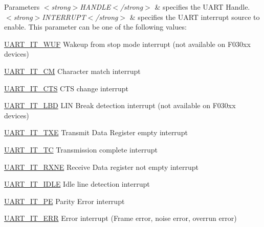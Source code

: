 \begin{DoxyParams}{Parameters}
{\em $<$strong$>$\+H\+A\+N\+D\+L\+E$<$/strong$>$} & specifies the U\+A\+RT Handle. \\
\hline
{\em $<$strong$>$\+I\+N\+T\+E\+R\+R\+U\+P\+T$<$/strong$>$} & specifies the U\+A\+RT interrupt source to enable. This parameter can be one of the following values\+: \begin{DoxyItemize}
\item \hyperlink{group___u_a_r_t___interrupt__definition_gab8899f6307781779f65a7c18aabb3204}{U\+A\+R\+T\+\_\+\+I\+T\+\_\+\+W\+UF} Wakeup from stop mode interrupt (not available on F030xx devices) \item \hyperlink{group___u_a_r_t___interrupt__definition_ga4c22e866bce68975a180828012489106}{U\+A\+R\+T\+\_\+\+I\+T\+\_\+\+CM} Character match interrupt \item \hyperlink{group___u_a_r_t___interrupt__definition_ga986d271478550f9afa918262ca642333}{U\+A\+R\+T\+\_\+\+I\+T\+\_\+\+C\+TS} C\+TS change interrupt \item \hyperlink{group___u_a_r_t___interrupt__definition_gabca5e77508dc2dd9aa26fcb683d9b988}{U\+A\+R\+T\+\_\+\+I\+T\+\_\+\+L\+BD} L\+IN Break detection interrupt (not available on F030xx devices) \item \hyperlink{group___u_a_r_t___interrupt__definition_ga552636e2af516d578856f5ee2ba71ed7}{U\+A\+R\+T\+\_\+\+I\+T\+\_\+\+T\+XE} Transmit Data Register empty interrupt \item \hyperlink{group___u_a_r_t___interrupt__definition_gab9a4dc4e8cea354fd60f4117513b2004}{U\+A\+R\+T\+\_\+\+I\+T\+\_\+\+TC} Transmission complete interrupt \item \hyperlink{group___u_a_r_t___interrupt__definition_gac1bedf7a65eb8c3f3c4b52bdb24b139d}{U\+A\+R\+T\+\_\+\+I\+T\+\_\+\+R\+X\+NE} Receive Data register not empty interrupt \item \hyperlink{group___u_a_r_t___interrupt__definition_ga9781808d4f9999061fc2da36572191d9}{U\+A\+R\+T\+\_\+\+I\+T\+\_\+\+I\+D\+LE} Idle line detection interrupt \item \hyperlink{group___u_a_r_t___interrupt__definition_ga55f922ddcf513509710ade5d7c40a1db}{U\+A\+R\+T\+\_\+\+I\+T\+\_\+\+PE} Parity Error interrupt \item \hyperlink{group___u_a_r_t___i_t_ga8eb26d8edd9bf78ae8d3ad87dd51b618}{U\+A\+R\+T\+\_\+\+I\+T\+\_\+\+E\+RR} Error interrupt (Frame error, noise error, overrun error) \end{DoxyItemize}
\\
\hline
\end{DoxyParams}

